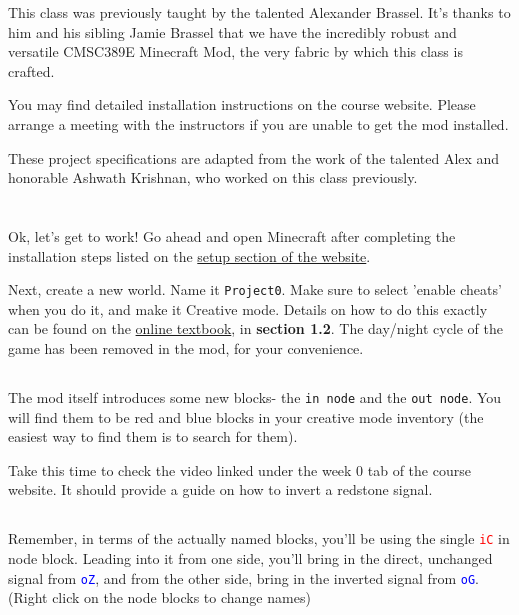 \documentclass{article}
\begin{document}
This class was previously taught by the talented Alexander Brassel. It's thanks to him and his sibling Jamie Brassel that we have the incredibly robust and versatile CMSC389E Minecraft Mod, the very fabric by which this class is crafted. 

You may find detailed installation instructions on the course website. Please arrange a meeting with the instructors if you are unable to get the mod installed.

These project specifications are adapted from the work of the talented Alex and honorable Ashwath Krishnan, who worked on this class previously.

\section{\selectfont{The First Project!}}

Ok, let's get to work! Go ahead and open Minecraft after completing the installation steps listed on the \href{https://cmsc-389e.github.io/setup.html}{setup section of the website}.

Next, create a new world. Name it \texttt{Project0}. Make sure to select 'enable cheats' when you do it, and make it Creative mode. Details on how to do this exactly can be found on the \href{https://cmsc-389e.github.io/digital-logic-computer-architecture-minecraft/index.html}{online textbook}, in \textbf{section 1.2}. The day/night cycle of the game has been removed in the mod, for your convenience.

\subsection{\selectfont{New Blocks}}

The mod itself introduces some new blocks- the \texttt{in node} and the \texttt{out node}. You will find them to be red and blue blocks in your creative mode inventory (the easiest way to find them is to search for them).

Take this time to check the video linked under the week 0 tab of the course website. It should provide a guide on how to invert a redstone signal.

\subsection{\selectfont{What to Build}}

Remember, in terms of the actually named blocks, you'll be using the single \textcolor{red}{\texttt{iC}} in node block. Leading into it from one side, you'll bring in the direct, unchanged signal from \textcolor{blue}{\texttt{oZ}}, and from the other side, bring in the inverted signal from \textcolor{blue}{\texttt{oG}}. (Right click on the node blocks to change names) 
\end{document}
